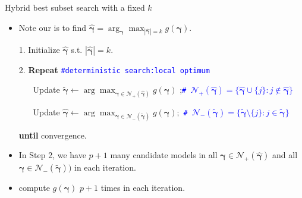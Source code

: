 \documentclass[citecolor=blue,10pt]{beamer}
\def\bg{{\boldsymbol \gamma}}
\newcommand{\0} {\mbox{\boldmath$0$}}
\begin{document}
\begin{frame}{Hybrid best subset search with a fixed $k$}

\begin{itemize}\itemsep=2mm
  \item  Note our {\color{red}{Goal (i)}} is to find  $\hat\bg = \arg_{\bg}\max_{|\hat\bg|=k}g(\bg)$. 
  \item[1.] Initialize $\hat{\bg}$ s.t. $|\hat{\bg}|=k$.
  \item[2.] \textbf{Repeat} \quad  \texttt{\textcolor{blue}{\#deterministic search:local optimum}}
        \begin{itemize}\itemsep=2mm
         \item[] Update $\tilde{\bg }\leftarrow \arg\max_{\bg  \in \mathcal{N}_+(\hat{\bg} ) } g(\bg)$ ;\quad  \texttt{\textcolor{blue}{\# $\mathcal{N}_+(\hat{\bg})=\{\hat{\bg} \cup \{j\}: j\notin \hat{\bg} \}$}}
         \item[] Update $\hat{\bg}\leftarrow  \arg\max_{\bg  \in \mathcal{N}_-(\tilde{\bg} ) } g(\bg);$ \quad \texttt{\textcolor{blue}{\# $\mathcal{N}_-(\tilde{\bg })= \{\tilde{\bg } \setminus \{j\}: j\in \tilde{\bg } \}$}}
        \end{itemize}
  \item[] \textbf{until} convergence.
  \pause
\item In Step 2, we have $p+1$ many candidate models in all $\bg \in \mathcal{N}_+(\hat{\bg})$ and all $\bg \in \mathcal{N}_-(\tilde{\bg}))$ in each iteration.
\item compute $g(\bg)$ $p+1$ times in each iteration. 
\end{itemize}
\end{frame}
\end{document}
